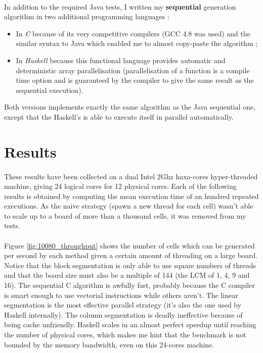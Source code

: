 \documentclass[a4paper]{article}
\begin{document}
    \paragraph{}In addition to the required Java tests, I written my
\textbf{sequential} generation algorithm in two additional programming
languages :
    \begin{itemize}
        \item In \textit{C} because of its very competitive compilers (GCC 4.8
was used) and the similar syntax to Java which enabled me to almost copy-paste
the algorithm ;
        \item In \textit{Haskell} because this functional language provides
automatic and deterministic array parallelisation (parallelisation of a function
is a compile time option and is guaranteed by the compiler to give the same
result as the sequential execution).
    \end{itemize}
Both versions implements exactly the same algorithm as the Java sequential one,
except that the Haskell's is able to execute itself in parallel automatically.

  \section{Results}

    \paragraph{}These results have been collected on a dual Intel 2Ghz
haxa-cores hyper-threaded machine, giving 24 logical cores for 12 physical
cores. Each of the following results is obtained by  computing the mean
execution time of an hundred repeated executions. As the naive strategy (spawn
a new thread for each cell) wasn't able to scale up to a board of more than
a thousand cells, it was removed from my tests.

    \paragraph{}Figure \ref{fig:10080_throughput} shows the number of cells
which can be generated per second by each method given a certain amount of
threading on a large board. Notice that the block segmentation is only able to
use square numbers of threads and that the board size must also be a multiple of
144 (the LCM of 1, 4, 9 and 16). \newline
The sequential C algorithm is awfully fast, probably because the C compiler is
smart enough to use vectorial instructions while others aren't.\newline
The linear segmentation is the most effective parallel strategy (it's also the
one used by Haskell internally). The column segmentation is deadly ineffective
because of being cache unfriendly. Haskell scales in an almost perfect speedup
until reaching the number of physical cores, which makes me hint that the
benchmark is not bounded by the memory bandwidth, even on this 24-cores machine.
\end{document}
